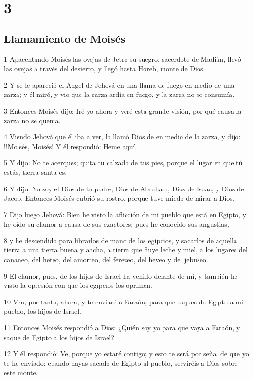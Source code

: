 \chapter{3}

\section*{Llamamiento de Moisés}
\par 1 Apacentando Moisés las ovejas de Jetro su suegro, sacerdote de Madián, llevó las ovejas a través del desierto, y llegó hasta Horeb, monte de Dios.
\par 2 Y se le apareció el Angel de Jehová en una llama de fuego en medio de una zarza; y él miró, y vio que la zarza ardía en fuego, y la zarza no se consumía.
\par 3 Entonces Moisés dijo: Iré yo ahora y veré esta grande visión, por qué causa la zarza no se quema.
\par 4 Viendo Jehová que él iba a ver, lo llamó Dios de en medio de la zarza, y dijo: !!Moisés, Moisés! Y él respondió: Heme aquí.
\par 5 Y dijo: No te acerques; quita tu calzado de tus pies, porque el lugar en que tú estás, tierra santa es.
\par 6 Y dijo: Yo soy el Dios de tu padre, Dios de Abraham, Dios de Isaac, y Dios de Jacob. Entonces Moisés cubrió su rostro, porque tuvo miedo de mirar a Dios.
\par 7 Dijo luego Jehová: Bien he visto la aflicción de mi pueblo que está en Egipto, y he oído su clamor a causa de sus exactores; pues he conocido sus angustias,
\par 8 y he descendido para librarlos de mano de los egipcios, y sacarlos de aquella tierra a una tierra buena y ancha, a tierra que fluye leche y miel, a los lugares del cananeo, del heteo, del amorreo, del ferezeo, del heveo y del jebuseo.
\par 9 El clamor, pues, de los hijos de Israel ha venido delante de mí, y también he visto la opresión con que los egipcios los oprimen.
\par 10 Ven, por tanto, ahora, y te enviaré a Faraón, para que saques de Egipto a mi pueblo, los hijos de Israel.
\par 11 Entonces Moisés respondió a Dios: ¿Quién soy yo para que vaya a Faraón, y saque de Egipto a los hijos de Israel?
\par 12 Y él respondió: Ve, porque yo estaré contigo; y esto te será por señal de que yo te he enviado: cuando hayas sacado de Egipto al pueblo, serviréis a Dios sobre este monte.

